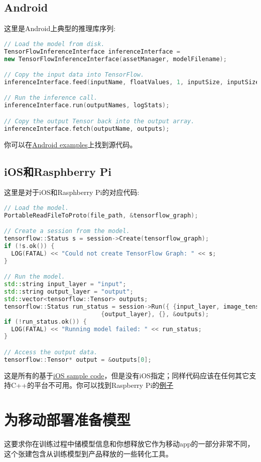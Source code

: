 \subsection{Android}
这里是Android上典型的推理库序列:
\begin{lstlisting}[language=C++]
// Load the model from disk.
TensorFlowInferenceInterface inferenceInterface =
new TensorFlowInferenceInterface(assetManager, modelFilename);

// Copy the input data into TensorFlow.
inferenceInterface.feed(inputName, floatValues, 1, inputSize, inputSize, 3);

// Run the inference call.
inferenceInterface.run(outputNames, logStats);

// Copy the output Tensor back into the output array.
inferenceInterface.fetch(outputName, outputs);
\end{lstlisting}
你可以在\href{https://github.com/tensorflow/tensorflow/blob/master/tensorflow/examples/android/src/org/tensorflow/demo/TensorFlowImageClassifier.java#L107}{Android examples}上找到源代码。
\subsection{iOS和Rasphberry Pi}
这里是对于iOS和Rasphberry Pi的对应代码:
\begin{lstlisting}[language=C++]
// Load the model.
PortableReadFileToProto(file_path, &tensorflow_graph);

// Create a session from the model.
tensorflow::Status s = session->Create(tensorflow_graph);
if (!s.ok()) {
  LOG(FATAL) << "Could not create TensorFlow Graph: " << s;
}

// Run the model.
std::string input_layer = "input";
std::string output_layer = "output";
std::vector<tensorflow::Tensor> outputs;
tensorflow::Status run_status = session->Run({ {input_layer, image_tensor}},
                           {output_layer}, {}, &outputs);
if (!run_status.ok()) {
  LOG(FATAL) << "Running model failed: " << run_status;
}

// Access the output data.
tensorflow::Tensor* output = &outputs[0];
\end{lstlisting}
这是所有的基于\href{https://www.github.com/tensorflow/tensorflow/blob/r1.4/tensorflow/examples/ios/simple/RunModelViewController.mm}{iOS sample code}，但是没有iOS指定；同样代码应该在任何其它支持C++的平台不可用。你可以找到Raspberry Pi的\href{https://github.com/tensorflow/tensorflow/blob/master/tensorflow/contrib/pi_examples/label_image/label_image.cc}{例子}
\section{为移动部署准备模型}
这要求你在训练过程中储模型信息和你想释放它作为移动app的一部分非常不同，这个张建包含从训练模型到产品释放的一些转化工具。
